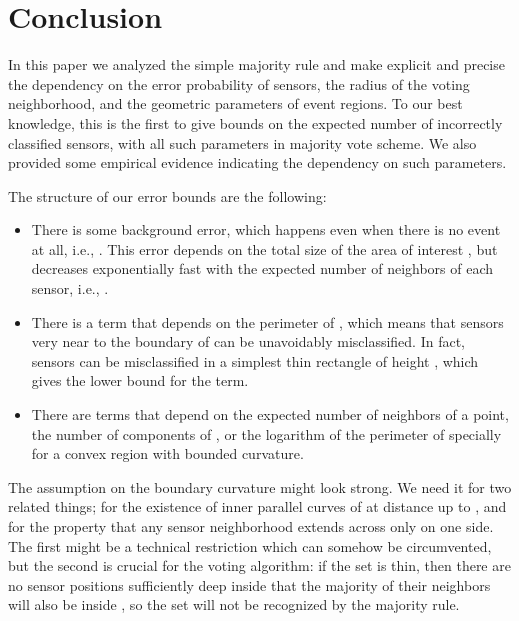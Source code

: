 \documentclass{article}
\begin{document}
\section{Conclusion}
In this paper we analyzed the simple majority rule and make explicit and precise the dependency on the error probability  of sensors, the radius  of the voting neighborhood, and the geometric parameters of event regions. To our best knowledge, this is the first to give bounds on the expected number of incorrectly classified sensors, with all such parameters in majority vote scheme. We also provided some empirical evidence indicating the dependency on such parameters.

The structure of our error bounds are the following:
\begin{itemize}
\item There is some background error,  which happens even when there is no event at all, i.e., . This error depends on the total size of the area of interest , but decreases exponentially fast with the expected number of neighbors of each sensor, i.e., .

\item There is a term that depends on the perimeter of , which means that sensors very near to the boundary of  can be unavoidably misclassified. In fact,  sensors can be misclassified in a simplest thin rectangle of height , which gives the lower bound for the term.

\item There are terms that depend on the expected number of neighbors of a point, the number of components of , or the logarithm of the perimeter of  specially for a convex region with bounded curvature.
\end{itemize}

\par
The assumption on the boundary curvature might look strong. We need it for two related things; for the existence of inner parallel curves of  at distance up to , and for the property that any sensor neighborhood extends across  only on one side. The first might be a technical restriction which can somehow be circumvented, but the second is crucial for the voting algorithm: if the set  is thin, then there are no sensor positions sufficiently deep inside  that the majority of their neighbors will also be inside , so the set will not be recognized by the majority rule.
\end{document}
